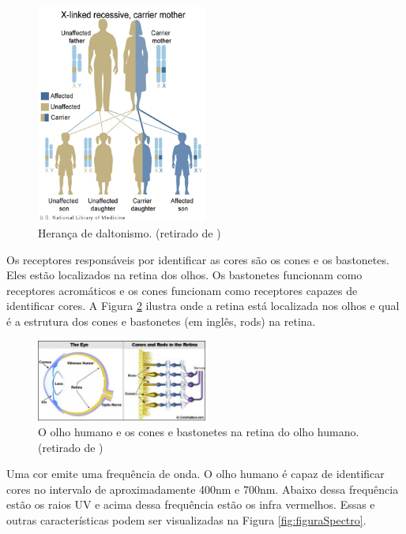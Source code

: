 \documentclass[	12pt, Times, openright, twoside, a4paper, english, brazil]{abntex2}
\begin{document}
\begin{figure}[!htb]
\centering
\includegraphics[width=0.5\textwidth]{figuraHerancaDaltonismo.jpg}
\caption{Herança de daltonismo. (retirado de ) \label{fig:figuraHerancaDaltonismo}}
\end{figure}

Os receptores responsáveis por identificar as cores são os cones e os bastonetes. Eles estão localizados na retina dos olhos. Os bastonetes funcionam como receptores acromáticos e os cones funcionam como receptores capazes de identificar cores. A Figura  \ref{fig:figuraOlhoHumano} ilustra onde a retina está localizada nos olhos e qual é a estrutura dos cones e bastonetes (em inglês, rods) na retina.

\begin{figure}[!htb]
\centering \includegraphics[width=0.5\textwidth]{figuraOlhoHumano.jpg}
\caption{O olho humano e os cones e bastonetes na retina do olho humano. (retirado de ) \label{fig:figuraOlhoHumano}}
\end{figure}

Uma cor emite uma frequência de onda. O olho humano é capaz de identificar cores no intervalo de aproximadamente 400nm e 700nm. Abaixo dessa frequência estão os raios UV e acima dessa frequência estão os infra vermelhos. Essas e outras características podem ser visualizadas na Figura \ref{fig:figuraSpectro}.
\end{document}
